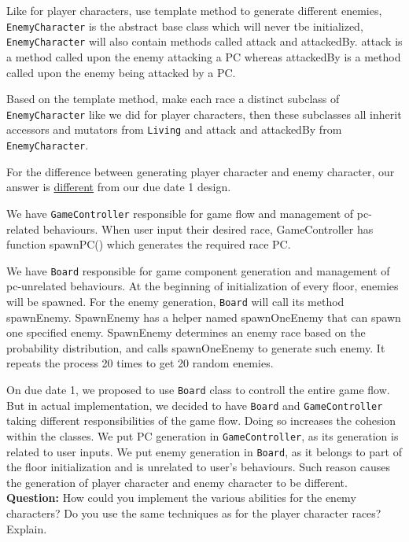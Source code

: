 \documentclass[11pt]{article}
\theoremstyle{plain} \newtheorem{theorem*}{Theorem}[subsection]
\begin{document}
Like for player characters, use template method to generate different enemies,
\texttt{EnemyCharacter} is the abstract base class which will
never tbe initialized, \texttt{EnemyCharacter} will also contain methods called
\textsf{attack} and \textsf{attackedBy}. 
\textsf{attack} is a method called upon the enemy attacking a PC whereas
\textsf{attackedBy} is a method called upon the enemy being attacked by a PC. 

Based on the template method, make each race a 
distinct subclass of \texttt{EnemyCharacter} like we did for player characters,
then these subclasses all inherit accessors and
mutators from \texttt{Living} and \textsf{attack} and \textsf{attackedBy}
from \texttt{EnemyCharacter}.


For the difference between generating player character and enemy character,
our answer is \underline{different} from our due date 1 design. 


We have \texttt{GameController} responsible for game flow and
management of pc-related behaviours. When user input their desired race,
GameController has function \textsf{spawnPC()} which generates
the required race PC.  

We have \texttt{Board} responsible for game component generation
and management of pc-unrelated behaviours. At the beginning of initialization
of every floor, enemies will be spawned. For the enemy generation, 
\texttt{Board} will call its method \textsf{spawnEnemy}. \textsf{SpawnEnemy} 
has a helper named \textsf{spawnOneEnemy} that can spawn one specified enemy. 
\textsf{SpawnEnemy} determines an enemy race based on the probability 
distribution, and calls \textsf{spawnOneEnemy} to generate such enemy.
It repeats the process 20 times to get 20 random enemies. 

On due date 1, we proposed to use \texttt{Board} class to controll the entire 
game flow. But in actual implementation, we decided to have \texttt{Board} 
and \texttt{GameController} taking different responsibilities of the game flow. 
Doing so increases the cohesion within the classes. We put PC generation in 
\texttt{GameController}, as its generation is related to user inputs. We put 
enemy generation in \texttt{Board}, as it belongs to part of the floor 
initialization and is unrelated to user’s behaviours. Such reason causes the 
generation of player character and enemy character to be different. \\

\textbf{Question:}
How could you implement the various abilities for the enemy characters? Do you
use the same techniques as for the player character races? Explain. 
\end{document}
